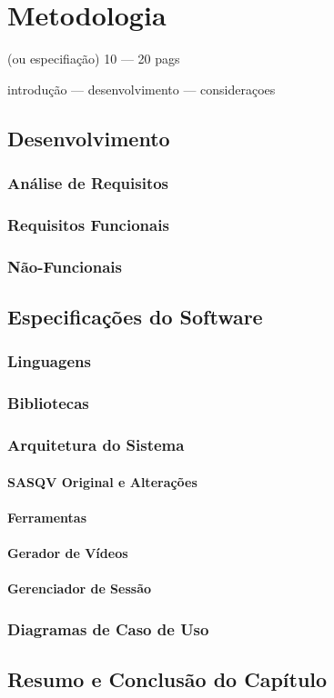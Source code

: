 
\chapter{Metodologia}
(ou especifiação) 10 --- 20 pags

introdução --- desenvolvimento --- consideraçoes

\section{Desenvolvimento}
\subsection{Análise de Requisitos}
\subsection{Requisitos Funcionais}
\subsection{Não-Funcionais}

\section{Especificações do Software}
\subsection{Linguagens}
\subsection{Bibliotecas}
\subsection{Arquitetura do Sistema}
\subsubsection{SASQV Original e Alterações}
\subsubsection{Ferramentas}
\subsubsection{Gerador de Vídeos}
\subsubsection{Gerenciador de Sessão}
\subsection{Diagramas de Caso de Uso}
\section{Resumo e Conclusão do Capítulo}
